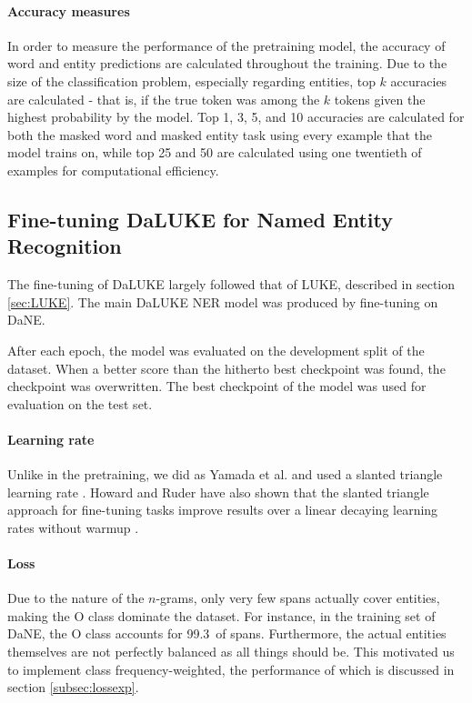\documentclass[main.tex]{subfiles}
\begin{document}
\paragraph{Accuracy measures}
In order to measure the performance of the pretraining model, the accuracy of word and entity predictions are calculated throughout the training.
Due to the size of the classification problem, especially regarding entities, top $ k $ accuracies are calculated - that is, if the true token was among the $ k $ tokens given the highest probability by the model.
Top 1, 3, 5, and 10 accuracies are calculated for both the masked word and masked entity task using every example that the model trains on, while top 25 and 50 are calculated using one twentieth of examples for computational efficiency.

\subsection{Fine-tuning DaLUKE for Named Entity Recognition}%
\label{sub:fine-tune-ner}
The fine-tuning of DaLUKE largely followed that of LUKE, described in section \ref{sec:LUKE}.
The main DaLUKE NER model was produced by fine-tuning on DaNE.

After each epoch, the model was evaluated on the development split of the dataset.
When a better score than the hitherto best checkpoint was found, the checkpoint was overwritten.
The best checkpoint of the model was used for evaluation on the test set.

\paragraph{Learning rate}
Unlike in the pretraining, we did as Yamada et al. and used a slanted triangle learning rate \cite{yamada2020luke}.
Howard and Ruder have also shown that the slanted triangle approach for fine-tuning tasks improve results over a linear decaying learning rates without warmup \cite{howardruder2018universal}.

\paragraph{Loss}
Due to the nature of the $ n $-grams, only very few spans actually cover entities, making the O class dominate the dataset.
For instance, in the training set of DaNE, the O class accounts for 99.3\pro\ of spans.
Furthermore, the actual entities themselves are not perfectly balanced as all things should be.
This motivated us to implement class frequency-weighted, the performance of which is discussed in section \ref{subsec:lossexp}.
\end{document}
